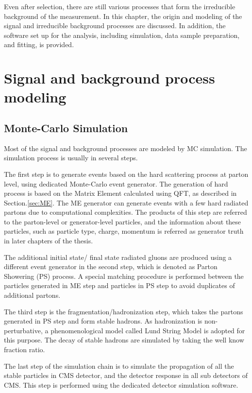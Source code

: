 Even after selection, there are still various processes that form the irreducible background of the measurement. In this chapter, the origin and modeling of the signal and irreducible background processes are discussed. In addition, the software set up for the analysis, including simulation, data sample preparation, and fitting, is provided.


\section{Signal and background process modeling}

\subsection{Monte-Carlo Simulation}
Most of the signal and background processes are modeled by MC simulation. The simulation process is usually in several steps. 

The first step is to generate events based on the hard scattering process at parton level, using dedicated Monte-Carlo event generator. The generation of hard process is based on the Matrix Element calculated using QFT, as described in Section.\ref{sec:ME}. The ME generator can generate events with a few hard radiated partons due to computational complexities. The products of this step are referred to the parton-level or generator-level particles, and the information about these particles, such as particle type, charge, momentum is referred as generator truth in later chapters of the thesis.

The additional initial state/ final state radiated gluons are produced using a different event generator in the second step, which is denoted as Parton Showering (PS) process. A special matching procedure is performed between the particles generated in ME step and particles in PS step to avoid duplicates of additional partons. 

The third step is the fragmentation/hadronization step, which takes the partons generated in PS step and form stable hadrons. As hadronization is non-perturbative, a phenomenological model called Lund String Model is adopted for this purpose. The decay of stable hadrons are simulated by taking the well know fraction ratio. 

The last step of the simulation chain is to simulate the propagation of all the stable particles in CMS detector, and the detector response in all sub detectors of CMS. This step is performed using the dedicated detector simulation software.

